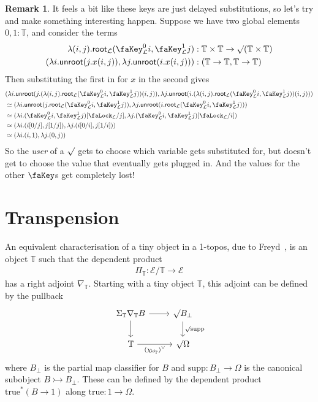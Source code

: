 \documentclass[10pt]{article}
\theoremstyle{definition}
\newtheorem{remark}[theorem]{Remark}
\let\oldequiv\equiv%
\renewcommand{\equiv}{\simeq}
\newcommand{\defeq}{\oldequiv}
\newcommand*{\id}{\mathsf{id}}
\newcommand{\lock}{\text{\faLock}}
\newcommand{\key}{\text{\faKey}}
\newcommand{\Tiny}{\mathbb{T}}
\newcommand{\lockn}[1]{\mathcal{#1}}
\newcommand{\varkey}[2]{\key_{\lockn{#1}}^{#2}}
\newcommand{\locksub}[2]{\lock_{\lockn{#1}}/#2}
\newcommand{\rformu}[1]{\surd #1}
\newcommand{\rintro}[2]{\mathsf{root}_{\lockn{#1}}(#2)}
\newcommand{\relim}[1]{\mathsf{unroot}(#1)}
\begin{document}
\begin{remark}
It feels a bit like these keys are just delayed substitutions, so let's try and make something interesting happen. Suppose we have two global elements $0,1 : \Tiny$, and consider the terms
\begin{align*}
\lambda(i,j). \rintro{L}{\varkey{L}{0} i, \varkey{L}{1} j} &: \Tiny \times \Tiny \to \rformu(\Tiny \times \Tiny) \\
(\lambda i. \relim{j. x(i,j)}, \lambda j. \relim{i. x(i,j)}) &: (\Tiny \to \Tiny, \Tiny \to \Tiny)
\end{align*}
Then substituting the first in for $x$ in the second gives
\begin{align*}
&(\lambda i. \relim{j. (\lambda(i,j). \rintro{L}{\varkey{L}{0} i, \varkey{L}{1} j})(i,j)}, \lambda j. \relim{i. (\lambda(i,j). \rintro{L}{\varkey{L}{0} i, \varkey{L}{1} j})(i,j)}) \\
&\defeq (\lambda i. \relim{j. \rintro{L}{\varkey{L}{0} i, \varkey{L}{1} j}}, \lambda j. \relim{i. \rintro{L}{\varkey{L}{0} i, \varkey{L}{1} j}}) \\
&\defeq (\lambda i. (\varkey{L}{0} i, \varkey{L}{1} j)[\locksub{L}{j}], \lambda j. (\varkey{L}{0} i, \varkey{L}{1} j)[\locksub{L}{i}]) \\
&\defeq (\lambda i. (i[0/j], j[1/j]), \lambda j. (i[0/i], j[1/i])) \\
&\defeq (\lambda i. (i,1), \lambda j. (0,j))
\end{align*}
So the \emph{user} of a $\rformu$ gets to choose which variable gets substituted for, but doesn't get to choose the value that eventually gets plugged in. And the values for the other $\key$s get completely lost!
\end{remark}

\section{Transpension}\label{sec:transpension}

An equivalent characterisation of a tiny object in a 1-topos, due to Freyd~\cite[Proposition 1.2]{yetter:tiny}, is an object $\Tiny$ such that the dependent product
\begin{align*}
\Pi_\Tiny : \mathcal{E}/\Tiny \to \mathcal{E}
\end{align*}
has a right adjoint $\nabla_\Tiny$. Starting with a tiny object $\Tiny$, this adjoint can be defined by the pullback
\[
\begin{tikzcd}
\Sigma_\Tiny \nabla_\Tiny B \ar[r] \ar[d] & \rformu B_\bot \ar[d, "\rformu \mathrm{supp}"] \\
\Tiny \ar[r, "{(\chi_{\id_\Tiny})^\vee}" swap] & \rformu \Omega
\end{tikzcd}
\]
where $B_\bot$ is the partial map classifier for $B$ and  $\mathrm{supp} : B_\bot \to \Omega$ is the canonical subobject $B \rightarrowtail B_\bot$. These can be defined by the dependent product $\mathrm{true}^*(B \to 1)$ along $\mathrm{true} : 1 \to \Omega$.
\end{document}
